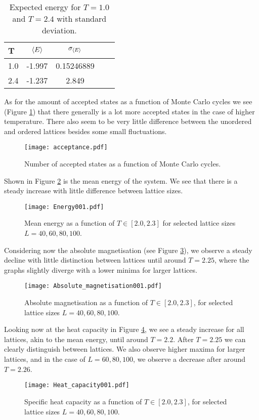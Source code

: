 \begin{table}[htbp]
	\centering
	\begin{tabular}{l|cccc}
		\textbf{T} & $\expval{E}$ & $\sigma_{\expval{E}}$  \\
		\midrule
		
		1.0 & -1.997 & 0.15246889 \\
		2.4 & -1.237 & 2.849  \\
	\end{tabular}
	\caption{Expected energy for $T=1.0$ and $T=2.4$ with standard deviation.}
	\label{table:energystd}
\end{table}


As for the amount of accepted states as a function of Monte Carlo cycles we see (Figure \ref{fig:acceptance}) that there generally is a lot more accepted states in the case of higher temperature. There also seem to be very little difference between the unordered and ordered lattices besides some small fluctuations.
\begin{figure}[htbp]
	\centering
	\texttt{[image: acceptance.pdf]}
	\caption{Number of accepted states as a function of Monte Carlo cycles.}
	\label{fig:acceptance}
\end{figure}

Shown in Figure \ref{fig:energy001} is the mean energy of the system. We see that there is a steady increase with little difference between lattice sizes.
\begin{figure}[htbp]
	\centering
	\texttt{[image: Energy001.pdf]}
	\caption{Mean energy as a function of $T \in[2.0, 2.3]$ for selected lattice sizes $L = 40, 60, 80, 100$.}
	\label{fig:energy001}
\end{figure}

Considering now the absolute magnetisation (see Figure \ref{fig:absmag}), we observe a steady decline with little distinction between lattices until around $T=2.25$, where the graphs slightly diverge with a lower minima for larger lattices.
\begin{figure}[htbp]
	\centering
	\texttt{[image: Absolute\_magnetisation001.pdf]}
	\caption{Absolute magnetisation as a function of $T \in[2.0, 2.3]$, for selected lattice sizes $L = 40, 60, 80, 100$.}
	\label{fig:absmag}
\end{figure}

Looking now at the heat capacity in Figure \ref{fig:heatcap001}, we see a steady increase for all lattices, akin to the mean energy, until around $T=2.2$. After $T=2.25$ we can clearly distinguish between lattices. We also observe higher maxima for larger lattices, and in the case of $L=60, 80, 100$, we observe a decrease after around $T=2.26$.
\begin{figure}[htbp]
	\centering
	\texttt{[image: Heat\_capacity001.pdf]}
	\caption{Specific heat capacity as a function of $T \in[2.0, 2.3]$, for selected lattice sizes $L = 40, 60, 80, 100$.}
	\label{fig:heatcap001}
\end{figure}

